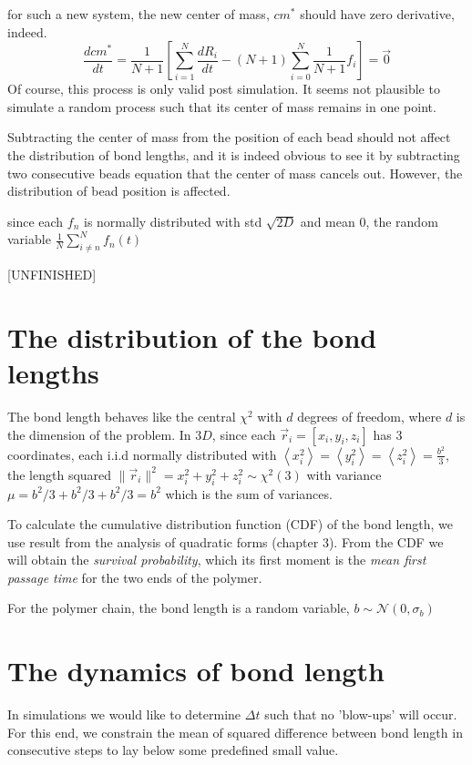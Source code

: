 \documentclass{paper}
\begin{document}
for such a new system, the new center of mass, $cm^*$ should have zero derivative, indeed. 
\begin{equation*}
\frac{dcm^*}{dt}=\frac{1}{N+1}\left[ \sum_{i=1}^N\frac{dR_i}{dt} - (N+1)\sum_{i=0}^N\frac{1}{N+1}f_i \right]= \vec{0}
\end{equation*}
Of course, this process is only valid post simulation. It seems not plausible to simulate a random process such that its center of mass remains in one point. 

Subtracting the center of mass from the position of each bead should not affect the distribution of bond lengths, and it is indeed obvious to see it by subtracting two consecutive beads equation that the center of mass cancels out. However, the distribution of bead position is affected. 

since each $f_n$ is normally distributed with std $\sqrt{2D}$ and mean 0, the random variable $\frac{1}{N}\sum_{i\neq n}^Nf_n(t)$ 

[UNFINISHED]

\section{The distribution of the bond lengths}\label{section_distributionOfTheBondLength}
The bond length behaves like the central $\chi ^2$ with $d$ degrees of freedom, where $d$ is the dimension of the problem. 
In $3D$, since each $\vec{r}_i=[x_i,y_i,z_i]$ has 3 coordinates, each i.i.d normally distributed with $\left<x_i^2\right>=\left<y_i^2\right>=\left<z_i^2\right>=\frac{b^2}{3}$, the length squared $\|\vec{r}_i\|^2=x_i^2+y_i^2+z_i^2\sim\chi^2(3)$ 
with variance $\mu=b^2/3+b^2/3+b^2/3=b^2$ which is the sum of variances.

To calculate the cumulative distribution function (CDF) of the bond length, we use result from the analysis of quadratic forms \cite{mathai1992quadratic} (chapter 3). From the CDF we will obtain the \textit{survival probability}, which its first moment is the \textit{mean first passage time} for the two ends of the polymer.

For the polymer chain, the bond length is a random variable, $b\sim \mathcal{N}(0,\sigma_b)$


\section{The dynamics of bond length}\label{section_theDynamicsOfBondLength}
In simulations we would like to determine $\Delta t$ such that no 'blow-ups' will occur. For this end, we constrain the mean of squared difference between bond length in consecutive steps to lay below some predefined small value. 
\end{document}
